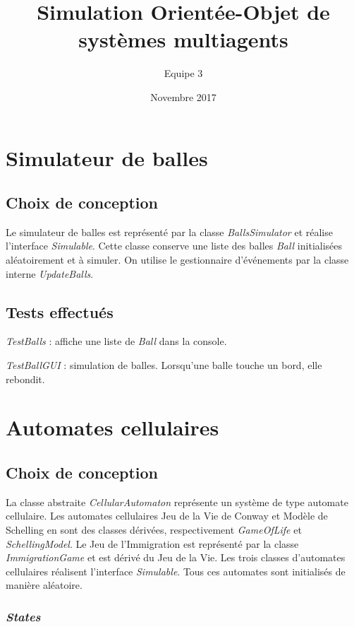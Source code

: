 \documentclass[a4paper, 11pt]{article}
\title{Simulation Orientée-Objet de systèmes multiagents}
\author{Equipe 3}
\date{Novembre 2017}
\begin{document}
\maketitle

\section{Simulateur de balles}

\subsection*{Choix de conception}

Le simulateur de balles est représenté par la classe \textit{BallsSimulator} et réalise l'interface \textit{Simulable}. Cette classe conserve une liste des balles \textit{Ball} initialisées aléatoirement et à simuler. On utilise le gestionnaire d'événements par la classe interne \textit{UpdateBalls}.

\subsection*{Tests effectués}

\textit{TestBalls} : affiche une liste de \textit{Ball} dans la console.

\textit{TestBallGUI} : simulation de balles. Lorsqu'une balle touche un bord, elle rebondit.

\section{Automates cellulaires}

\subsection*{Choix de conception}

La classe abstraite \textit{CellularAutomaton} représente un système de type automate cellulaire. Les automates cellulaires Jeu de la Vie de Conway et Modèle de Schelling en sont des classes dérivées, respectivement \textit{GameOfLife} et \textit{SchellingModel}. Le Jeu de l'Immigration est représenté par la classe \textit{ImmigrationGame} et est dérivé du Jeu de la Vie. Les trois classes d'automates cellulaires réalisent l'interface \textit{Simulable}. Tous ces automates sont initialisés de manière aléatoire.

\subsubsection*{\textit{States}}
\end{document}
